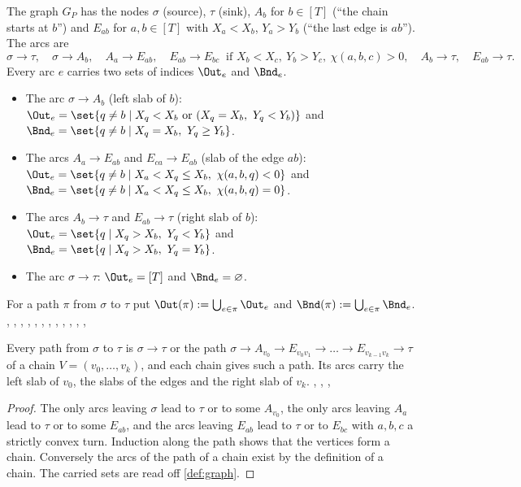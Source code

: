 \begin{definition}\label{def:graph}
The graph $G_P$ has the nodes $\sigma$ (source), $\tau$ (sink), $A_b$ for $b\in[T]$ (``the chain starts at $b$'') and $E_{ab}$ for $a,b\in[T]$ with $X_a<X_b$, $Y_a>Y_b$ (``the last edge is $ab$''). The arcs are
\[
\sigma\to\tau,\quad \sigma\to A_b,\quad A_a\to E_{ab},\quad E_{ab}\to E_{bc}\ \text{ if }X_b<X_c,\ Y_b>Y_c,\ \chi(a,b,c)>0,\quad A_b\to\tau,\quad E_{ab}\to\tau.
\]
Every arc $e$ carries two sets of indices $\Out_e$ and $\Bnd_e$.
\begin{itemize}
\item The arc $\sigma\to A_b$ (left slab of $b$): $\Out_e=\set{q\ne b\mid X_q<X_b\ \text{or}\ (X_q=X_b,\ Y_q<Y_b)}$ and $\Bnd_e=\set{q\ne b\mid X_q=X_b,\ Y_q\ge Y_b}$.
\item The arcs $A_a\to E_{ab}$ and $E_{ca}\to E_{ab}$ (slab of the edge $ab$): $\Out_e=\set{q\ne b\mid X_a<X_q\le X_b,\ \chi(a,b,q)<0}$ and $\Bnd_e=\set{q\ne b\mid X_a<X_q\le X_b,\ \chi(a,b,q)=0}$.
\item The arcs $A_b\to\tau$ and $E_{ab}\to\tau$ (right slab of $b$): $\Out_e=\set{q\mid X_q>X_b,\ Y_q<Y_b}$ and $\Bnd_e=\set{q\mid X_q>X_b,\ Y_q=Y_b}$.
\item The arc $\sigma\to\tau$: $\Out_e=[T]$ and $\Bnd_e=\varnothing$.
\end{itemize}
For a path $\pi$ from $\sigma$ to $\tau$ put $\Out(\pi):=\bigcup_{e\in\pi}\Out_e$ and $\Bnd(\pi):=\bigcup_{e\in\pi}\Bnd_e$. \hfill{}, , , , , , , , , , , , 
\end{definition}

\begin{lemma}\label{lem:paths}
Every path from $\sigma$ to $\tau$ is $\sigma\to\tau$ or the path $\sigma\to A_{v_0}\to E_{v_0v_1}\to\dots\to E_{v_{k-1}v_k}\to\tau$ of a chain $V=(v_0,\dots,v_k)$, and each chain gives such a path. Its arcs carry the left slab of $v_0$, the slabs of the edges and the right slab of $v_k$. \hfill{}, , , 
\end{lemma}

\begin{proof}
The only arcs leaving $\sigma$ lead to $\tau$ or to some $A_{v_0}$, the only arcs leaving $A_a$ lead to $\tau$ or to some $E_{ab}$, and the arcs leaving $E_{ab}$ lead to $\tau$ or to $E_{bc}$ with $a,b,c$ a strictly convex turn. Induction along the path shows that the vertices form a chain. Conversely the arcs of the path of a chain exist by the definition of a chain. The carried sets are read off \cref{def:graph}.
\end{proof}

